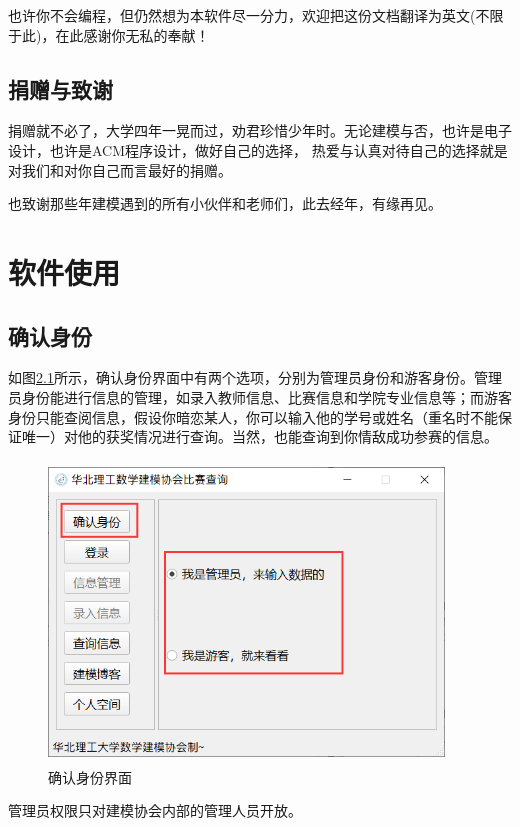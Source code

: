\documentclass[cn, 11pt, chinese, show]{elegantbook}
\begin{document}
也许你不会编程，但仍然想为本软件尽一分力，欢迎把这份文档翻译为英文(不限于此)，在此感谢你无私的奉献！

\section{捐赠与致谢}

捐赠就不必了，大学四年一晃而过，劝君珍惜少年时。无论建模与否，也许是电子设计，也许是ACM程序设计，做好自己的选择，
热爱与认真对待自己的选择就是对我们和对你自己而言最好的捐赠。

也致谢那些年建模遇到的所有小伙伴和老师们，此去经年，有缘再见。

\chapter{软件使用}

\section{确认身份}

如图\ref{fig:verify}所示，确认身份界面中有两个选项，分别为管理员身份和游客身份。管理员身份能进行信息的管理，如录入教师信息、比赛信息和学院专业信息等；而游客身份只能查阅信息，假设你暗恋某人，你可以输入他的学号或姓名（重名时不能保证唯一）对他的获奖情况进行查询。当然，也能查询到你情敌成功参赛的信息。
\begin{figure}[h]
    \centering
    \includegraphics[width=10.5cm, height=8cm]{figure/2.png}
    \caption{确认身份界面}
    \label{fig:verify}
\end{figure}

\begin{remark}
管理员权限只对建模协会内部的管理人员开放。
\end{remark}
\end{document}
